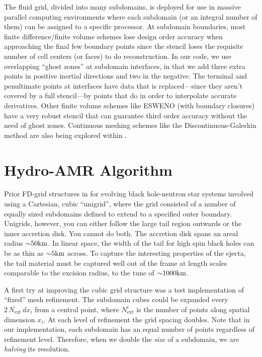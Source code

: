 The fluid grid, divided into many subdomains, is deployed for use in massive parallel computing environments where each subdomain (or an integral number of them) can be assigned to a specific processor. 
At subdomain boundaries, most finite difference/finite volume schemes lose design order accuracy when approaching the final few boundary points since the stencil loses the requisite number of cell centers (or faces) to do reconstruction.
In our code, we use overlapping ``ghost zones'' at subdomain interfaces, in that we add three extra points in positive inertial directions and two in the negative.
The terminal and penultimate points at interfaces have data that is  replaced---since they aren't covered by a full stencil---by points that do in order to interpolate accurate derivatives.
Other finite volume schemes like ESWENO (with boundary closures) have a very robust stencil that can guarantee third order accuracy without the need of ghost zones.  
Continuous meshing schemes like the Discontinuous-Galerkin method are also being explored within \SpEC.



\section{Hydro-AMR Algorithm}
\label{sec:hydro-amr}

Prior FD-grid structures in \SpEC for evolving black hole-neutron star systems involved using a Cartesian, cubic ``unigrid'', where the grid consisted of a number of equally sized subdomains defined to extend to a specified outer boundary.  
Unigrids, however, you can either follow the large tail region outwards or the inner accretion disk.
You cannot do both.  
The accretion disk spans an areal radius $\mathord{\sim} 50 \textrm{km}$.  
In linear space, the width of the tail for high spin black holes can be as thin as $\mathord{\sim} 5 \textrm{km}$ across.  
To capture the interesting properties of the ejecta, the tail material must be captured well out of the frame at length scales comparable to the excision radius, to the tune of $\mathord{\sim} 1000 \textrm{km}$.

A first try at improving the cubic grid structure was a test implementation of ``fixed'' mesh refinement.
The subdomain cubes could be expanded every $2\,N_\textrm{ext}\,dx_i$ from a central point, where $N^i_\textrm{ext}$ is the number of points along spatial dimension $x_i$.
At each level of refinement the grid spacing doubles.
Note that in our implementation, each subdomain has an equal number of points regardless of refinement level.
Therefore, when we double the \textit{size} of a subdomain, we are \textit{halving} its resolution.


